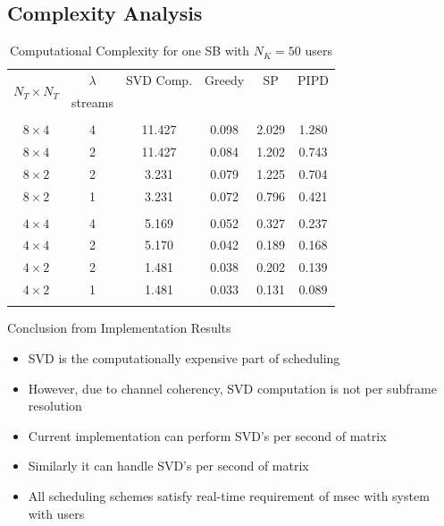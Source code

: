 \documentclass[11pt]{beamer}
\begin{document}
\subsection{Complexity Analysis}

\begin{frame}
\begin{table} \caption{Computational Complexity for one SB with $N_K = 50$ users} \begin{center} 
		\begin{tabular}{c c c c c c}
			\multirow{2}{*}{$N_T \times N_T $} & $\lambda$ & SVD Comp. & Greedy   & SP          & PIPD \\ 
			& streams & \eqn{\mathrm{msec}} & \eqn{\mathrm{msec}} & \eqn{\mathrm{msec}} & \eqn{\mathrm{msec}} \\
			\hline \\
			$8 \times 4$ & 4 & 11.427 & 0.098 & 2.029 & 1.280 \\ 
			$8 \times 4$ & 2 & 11.427 & 0.084 & 1.202 & 0.743 \\
			$8 \times 2$ & 2 & 3.231 & 0.079 & 1.225 & 0.704 \\
			$8 \times 2$ & 1 & 3.231 & 0.072 & 0.796 & 0.421 \\
			\hline \\
			$4 \times 4$ & 4 & 5.169 & 0.052 & 0.327 & 0.237 \\ 
			$4 \times 4$ & 2 & 5.170 & 0.042 & 0.189 & 0.168 \\
			$4 \times 2$ & 2 & 1.481 & 0.038 & 0.202 & 0.139 \\
			$4 \times 2$ & 1 & 1.481 & 0.033 & 0.131 & 0.089 \\
			\hline \vspace{-0.3in}
		\end{tabular} \label{table:compexity_comparison}\end{center}\end{table}
\end{frame}

\begin{frame}{Conclusion from Implementation Results}
	\begin{itemize}
		\item SVD is the computationally expensive part of scheduling
		\item However, due to channel coherency, SVD computation is not per subframe resolution
		\item Current implementation can perform  SVD's per second of  matrix
		\item Similarly it can handle  SVD's per second of  matrix
		\item All scheduling schemes satisfy real-time requirement of msec with  system with  users
	\end{itemize}
\end{frame}
\end{document}
